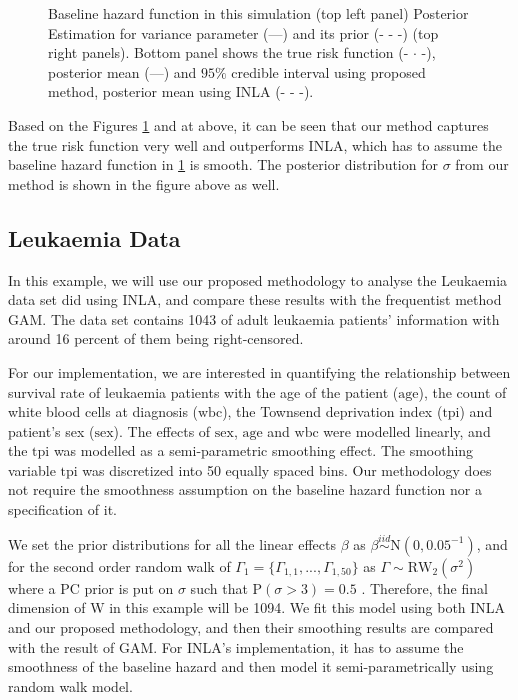 \documentclass[]{article}
\begin{document}
\begin{figure}[ht]
\caption{Baseline hazard function in this simulation (top left panel) Posterior Estimation for variance parameter (---) and its prior (- - -)  (top right panels). Bottom panel shows the true risk function (- $\cdot$ -), posterior mean (---) and $95\%$ credible interval using proposed method, posterior mean using INLA (- - -).}
\label{fig:simulation}
\end{figure}


Based on the Figures \ref{fig:simulation} and at above, it can be seen that our method captures the true risk function very well and outperforms INLA, which has to assume the baseline hazard function in \ref{fig:simulation} is smooth. The posterior distribution for $\sigma$ from our method is shown in the figure above as well.

\subsection{Leukaemia Data}

In this example, we will use our proposed methodology to analyse the Leukaemia data set \citet{inlacoxph} did using INLA, and compare these results with the frequentist method GAM. The data set contains 1043 of adult leukaemia patients' information with around 16 percent of them being right-censored. 

For our implementation, we are interested in quantifying the relationship between survival rate of leukaemia patients with the age of the patient ($\text{age}$), the count of white blood cells at diagnosis ($\text{wbc}$), the Townsend deprivation index ($\text{tpi}$) and patient's sex ($\text{sex}$). The effects of $\text{sex}$, $\text{age}$ and $\text{wbc}$ were modelled linearly, and the $\text{tpi}$ was modelled as a semi-parametric smoothing effect. The smoothing variable $\text{tpi}$ was discretized into 50 equally spaced bins. Our methodology does not require the smoothness assumption on the baseline hazard function nor a specification of it.

We set the prior distributions for all the linear effects $\beta$ as $\beta \stackrel{iid}{\sim} \text{N}(0, 0.05^{-1})$, and for the second order random walk of $\Gamma_1 = \{\Gamma_{1,1}, ..., \Gamma_{1,50}\}$ as $\Gamma \sim \text{RW}_2(\sigma^2)$ where a PC prior is put on $\sigma$ such that $\text{P}(\sigma > 3) = 0.5$ \citep{pcprior}. Therefore, the final dimension of W in this example will be 1094. We fit this model using both INLA and our proposed methodology, and then their smoothing results are compared with the result of GAM. For INLA's implementation, it has to assume the smoothness of the baseline hazard and then model it semi-parametrically using random walk model. 
\end{document}
